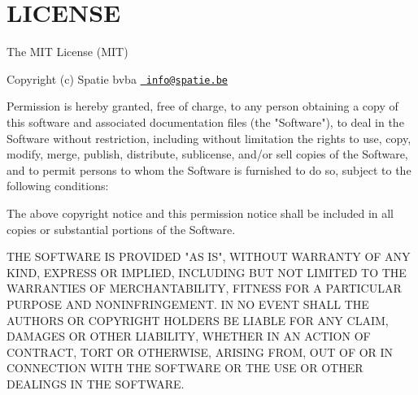 \chapter{LICENSE}
\hypertarget{md_vendor_2spatie_2backtrace_2_l_i_c_e_n_s_e}{}\label{md_vendor_2spatie_2backtrace_2_l_i_c_e_n_s_e}
The MIT License (MIT)

Copyright (c) Spatie bvba \href{mailto:info@spatie.be}{\texttt{ info@spatie.\+be}}

Permission is hereby granted, free of charge, to any person obtaining a copy of this software and associated documentation files (the "{}\+Software"{}), to deal in the Software without restriction, including without limitation the rights to use, copy, modify, merge, publish, distribute, sublicense, and/or sell copies of the Software, and to permit persons to whom the Software is furnished to do so, subject to the following conditions\+:

The above copyright notice and this permission notice shall be included in all copies or substantial portions of the Software.

THE SOFTWARE IS PROVIDED "{}\+AS IS"{}, WITHOUT WARRANTY OF ANY KIND, EXPRESS OR IMPLIED, INCLUDING BUT NOT LIMITED TO THE WARRANTIES OF MERCHANTABILITY, FITNESS FOR A PARTICULAR PURPOSE AND NONINFRINGEMENT. IN NO EVENT SHALL THE AUTHORS OR COPYRIGHT HOLDERS BE LIABLE FOR ANY CLAIM, DAMAGES OR OTHER LIABILITY, WHETHER IN AN ACTION OF CONTRACT, TORT OR OTHERWISE, ARISING FROM, OUT OF OR IN CONNECTION WITH THE SOFTWARE OR THE USE OR OTHER DEALINGS IN THE SOFTWARE. 